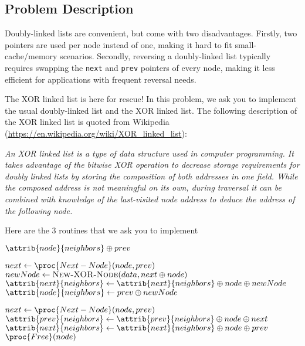 \setcounter{secnumdepth}{0}

\subsection{Problem Description}\label{problem-description}

Doubly-linked lists are convenient, but come with two disadvantages. Firstly, two pointers are used per node instead of one, making it hard to fit small-cache/memory scenarios. Secondly, reversing a doubly-linked list typically requires swapping the \texttt{next} and \texttt{prev} pointers of every node, making it less efficient for applications with frequent reversal needs.

The XOR linked list is here for rescue! In this problem, we ask you to implement the usual doubly-linked list and the XOR linked list. The following description of the XOR linked list is quoted from Wikipedia (\url{https://en.wikipedia.org/wiki/XOR_linked_list}): 

{\it
An XOR linked list is a type of data structure used in computer programming. It takes advantage of the bitwise XOR operation to decrease storage requirements for doubly linked lists by storing the composition of both addresses in one field. While the composed address is not meaningful on its own, during traversal it can be combined with knowledge of the last-visited node address to deduce the address of the following node.
}

Here are the 3 routines that we ask you to implement
\begin{codebox}
\li \Return $\attrib{node}{neighbors} \oplus prev$
\End
\end{codebox}

\begin{codebox}
\li $next \gets \proc{Next-Node}(node, prev)$
\li $newNode \gets \textsc{New-XOR-Node}(data, next \oplus node)$
\li $\attrib{next}{neighbors} \gets \attrib{next}{neighbors} \oplus node \oplus newNode$
\li $\attrib{node}{neighbors} \gets prev \oplus newNode$
\End
\end{codebox}

\begin{codebox}
\li $next \gets \proc{Next-Node}(node, prev)$
\li $\attrib{prev}{neighbors} \gets \attrib{prev}{neighbors} \oplus node \oplus next$
\li $\attrib{next}{neighbors} \gets \attrib{next}{neighbors} \oplus node \oplus prev$
\li $\proc{Free}(node)$
\End
\end{codebox}

